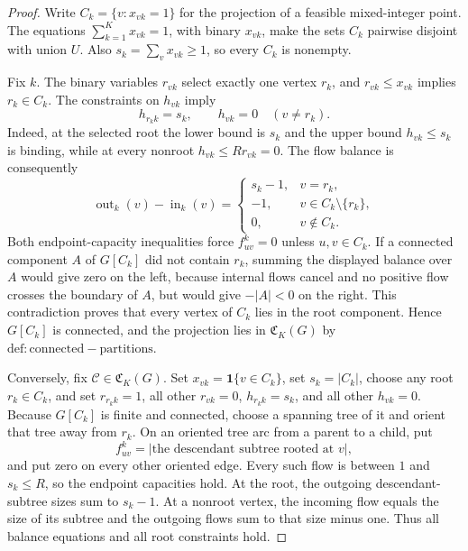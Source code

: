\documentclass{article}
\begin{document}
\begin{proof}
Write \(C_k=\{v:x_{vk}=1\}\) for the projection of a feasible mixed-integer point.  The equations \(\sum_{k=1}^Kx_{vk}=1\), with binary \(x_{vk}\), make the sets \(C_k\) pairwise disjoint with union \(U\).  Also \(s_k=\sum_vx_{vk}\ge1\), so every \(C_k\) is nonempty.

Fix \(k\).  The binary variables \(r_{vk}\) select exactly one vertex \(r_k\), and \(r_{vk}\le x_{vk}\) implies \(r_k\in C_k\).  The constraints on \(h_{vk}\) imply
\[
 h_{r_k k}=s_k,\qquad h_{vk}=0\quad(v\ne r_k).
\]
Indeed, at the selected root the lower bound is \(s_k\) and the upper bound \(h_{vk}\le s_k\) is binding, while at every nonroot \(h_{vk}\le Rr_{vk}=0\).  The flow balance is consequently
\[
 \operatorname{out}_k(v)-\operatorname{in}_k(v)
 =\begin{cases}
 s_k-1,&v=r_k,\\
 -1,&v\in C_k\setminus\{r_k\},\\
 0,&v\notin C_k.
 \end{cases}
\]
Both endpoint-capacity inequalities force \(f^k_{uv}=0\) unless \(u,v\in C_k\).  If a connected component \(A\) of \(G[C_k]\) did not contain \(r_k\), summing the displayed balance over \(A\) would give zero on the left, because internal flows cancel and no positive flow crosses the boundary of \(A\), but would give \(-|A|<0\) on the right.  This contradiction proves that every vertex of \(C_k\) lies in the root component.  Hence \(G[C_k]\) is connected, and the projection lies in \(\mathfrak C_K(G)\) by \(\mathrm{def:connected-partitions}\).

Conversely, fix \(\mathcal C\in\mathfrak C_K(G)\).  Set \(x_{vk}=\mathbf 1\{v\in C_k\}\), set \(s_k=|C_k|\), choose any root \(r_k\in C_k\), and set \(r_{r_k k}=1\), all other \(r_{vk}=0\), \(h_{r_k k}=s_k\), and all other \(h_{vk}=0\).  Because \(G[C_k]\) is finite and connected, choose a spanning tree of it and orient that tree away from \(r_k\).  On an oriented tree arc from a parent to a child, put
\[
 f^k_{uv}=\bigl|\text{the descendant subtree rooted at }v\bigr|,
\]
and put zero on every other oriented edge.  Every such flow is between \(1\) and \(s_k\le R\), so the endpoint capacities hold.  At the root, the outgoing descendant-subtree sizes sum to \(s_k-1\).  At a nonroot vertex, the incoming flow equals the size of its subtree and the outgoing flows sum to that size minus one.  Thus all balance equations and all root constraints hold.


\end{proof}
\end{document}
